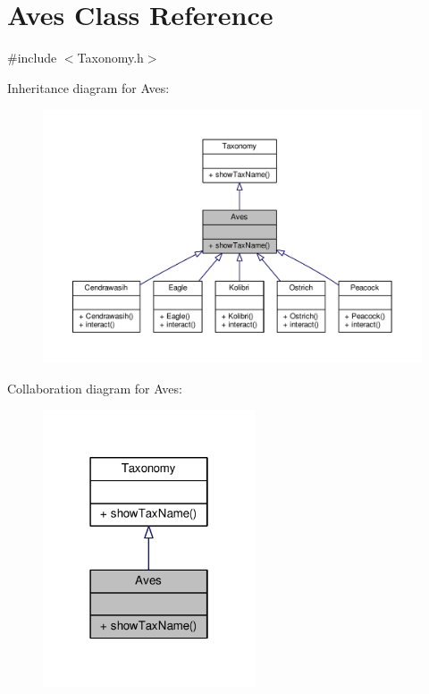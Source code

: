 \hypertarget{classAves}{}\section{Aves Class Reference}
\label{classAves}


{\ttfamily \#include $<$Taxonomy.\+h$>$}



Inheritance diagram for Aves\+:
\nopagebreak
\begin{figure}[H]
\begin{center}
\leavevmode
\includegraphics[width=350pt]{classAves__inherit__graph}
\end{center}
\end{figure}


Collaboration diagram for Aves\+:
\nopagebreak
\begin{figure}[H]
\begin{center}
\leavevmode
\includegraphics[width=178pt]{classAves__coll__graph}
\end{center}
\end{figure}
